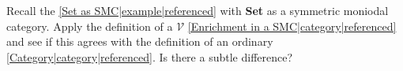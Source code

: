 
Recall the \ref{Set as SMC|example|referenced} with \textbf{Set} as a symmetric moniodal category. Apply the definition of a $\mathcal{V}$ \ref{Enrichment in a SMC|category|referenced} and see if this agrees with the definition of an ordinary \ref{Category|category|referenced}. Is there a subtle difference?